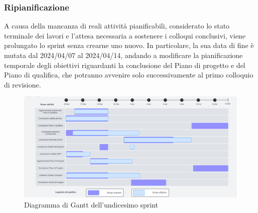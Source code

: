\subsubsection{Ripianificazione}
A causa della mancanza di reali attività pianificabili, considerato lo stato terminale dei lavori e l'attesa necessaria a sostenere i colloqui conclusivi, viene prolungato lo sprint senza crearne uno nuovo. In particolare, la sua data di fine è mutata dal 2024/04/07 al 2024/04/14, andando a modificare la pianificazione temporale degli obiettivi riguardanti la conclusione del Piano di progetto e del Piano di qualifica, che potranno avvenire solo successivamente al primo colloquio di revisione.

\begin{figure}[h!]
    \centering
    \includegraphics[width=\textwidth]{Roadmap11sprint.png} 
    \caption{Diagramma di Gantt dell'undicesimo sprint}
    \label{fig:roadmaps11s}
\end{figure}
\newpage
